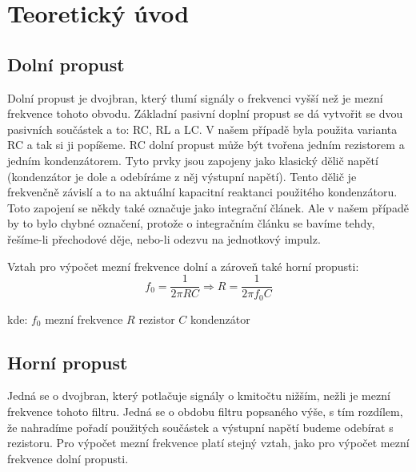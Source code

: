 \section*{Teoretický úvod}
		\subsection*{Dolní propust}
			\indent\indent
			Dolní propust je dvojbran, který tlumí signály o frekvenci  vyšší než je mezní frekvence tohoto obvodu. Základní pasivní doplní propust se dá vytvořit se dvou pasivních součástek a to: RC, RL a LC. V našem případě byla použita varianta RC a tak si ji popíšeme. RC dolní propust může být tvořena jedním rezistorem a jedním kondenzátorem. Tyto prvky jsou zapojeny jako klasický dělič napětí (kondenzátor je dole a odebíráme z něj výstupní napětí). Tento dělič je frekvenčně závislí a to na aktuální kapacitní reaktanci použitého kondenzátoru. Toto zapojení se někdy také označuje jako integrační článek. Ale v našem případě by to bylo chybné označení, protože o integračním článku se bavíme tehdy, řešíme-li přechodové děje, nebo-li odezvu na jednotkový impulz.
			
			Vztah pro výpočet mezní frekvence dolní a zároveň také horní propusti:
			\begin{equation}
  				f_0 = \dfrac{1}{2\pi R C} \Rightarrow R = \dfrac{1}{2\pi f_0 C}
  			\end{equation}		
		
			\hspace*{2cm}kde:\newline    
  			\hspace*{4cm}$f_0$ \dotfill mezní frekvence\hspace*{4cm}\newline
	  		\hspace*{4cm}$R$ \dotfill rezistor\hspace*{4cm}\newline
	  		\hspace*{4cm}$C$ \dotfill kondenzátor\hspace*{4cm}\newline
			
		
		\subsection*{Horní propust}
			\indent\indent
			Jedná se o dvojbran, který potlačuje signály o kmitočtu nižším, nežli je mezní frekvence tohoto filtru. Jedná se o obdobu filtru popsaného výše, s tím rozdílem, že nahradíme pořadí použitých součástek a výstupní napětí budeme odebírat s rezistoru. Pro výpočet mezní frekvence platí stejný vztah, jako pro výpočet mezní frekvence dolní propusti.
		
